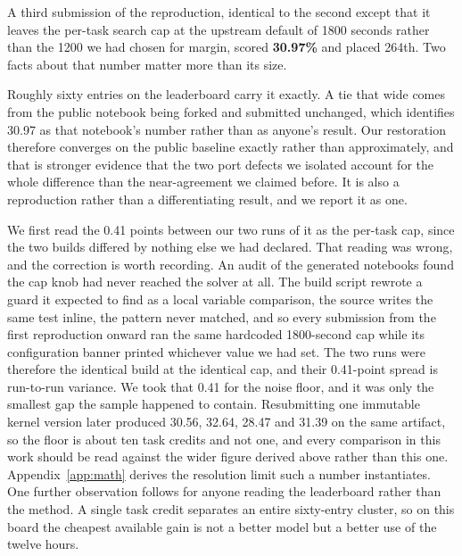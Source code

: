 \documentclass[11pt]{article}
\begin{document}
A third submission of the reproduction, identical to the second except that it leaves the per-task search
cap at the upstream default of 1800 seconds rather than the 1200 we had chosen for margin, scored
\textbf{30.97\%} and placed 264th. Two facts about that number matter more than its size.

Roughly sixty entries on the leaderboard carry it exactly. A tie that wide comes from the
public notebook being forked and submitted unchanged, which identifies 30.97 as that notebook's number
rather than as anyone's result. Our restoration therefore converges on the public baseline exactly rather
than approximately, and that is stronger evidence that the two port defects we isolated account for the
whole difference than the near-agreement we claimed before. It is also a reproduction rather than
a differentiating result, and we report it as one.

We first read the 0.41 points between our two runs of it as the per-task cap, since the two builds
differed by nothing else we had declared. That reading was wrong, and the correction is worth
recording. An audit of the generated notebooks found the cap knob had never reached the solver
at all. The build script rewrote a guard it expected to find as a local variable comparison, the source
writes the same test inline, the pattern never matched, and so every submission from the first reproduction
onward ran the same hardcoded 1800-second cap while its configuration banner printed whichever value we
had set. The two runs were therefore the identical build at the identical cap, and their 0.41-point spread is
run-to-run variance. We took that 0.41 for the noise floor, and it was only the smallest gap the
sample happened to contain. Resubmitting one immutable kernel version later produced 30.56, 32.64,
28.47 and 31.39 on the same artifact, so the floor is about ten task credits and not one, and every
comparison in this work should be read against the wider figure derived above rather than this one.
Appendix~\ref{app:math} derives the resolution limit such a number instantiates. One further observation follows for
anyone reading the leaderboard rather than the method. A single task credit separates an entire sixty-entry
cluster, so on this board the cheapest available gain is not a better model but a better use of the twelve
hours.
\end{document}
